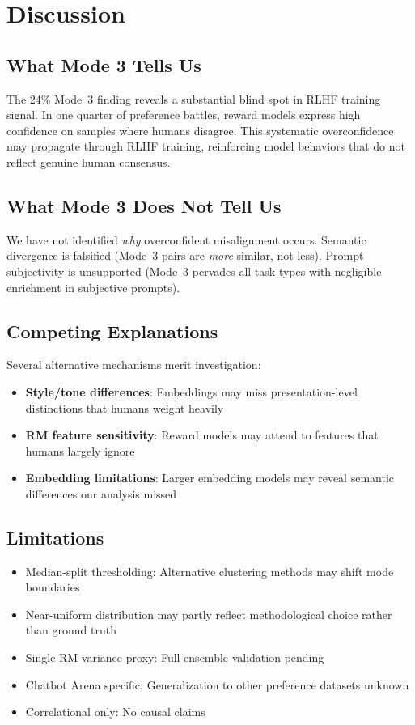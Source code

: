 \section{Discussion}

\subsection{What Mode 3 Tells Us}

The 24\% Mode~3 finding reveals a substantial blind spot in RLHF training signal. In one quarter of preference battles, reward models express high confidence on samples where humans disagree. This systematic overconfidence may propagate through RLHF training, reinforcing model behaviors that do not reflect genuine human consensus.

\subsection{What Mode 3 Does Not Tell Us}

We have not identified \emph{why} overconfident misalignment occurs. Semantic divergence is falsified (Mode~3 pairs are \emph{more} similar, not less). Prompt subjectivity is unsupported (Mode~3 pervades all task types with negligible enrichment in subjective prompts).

\subsection{Competing Explanations}

Several alternative mechanisms merit investigation:
\begin{itemize}
    \item \textbf{Style/tone differences}: Embeddings may miss presentation-level distinctions that humans weight heavily
    \item \textbf{RM feature sensitivity}: Reward models may attend to features that humans largely ignore
    \item \textbf{Embedding limitations}: Larger embedding models may reveal semantic differences our analysis missed
\end{itemize}

\subsection{Limitations}

\begin{itemize}
    \item Median-split thresholding: Alternative clustering methods may shift mode boundaries
    \item Near-uniform distribution may partly reflect methodological choice rather than ground truth
    \item Single RM variance proxy: Full ensemble validation pending
    \item Chatbot Arena specific: Generalization to other preference datasets unknown
    \item Correlational only: No causal claims
\end{itemize}
